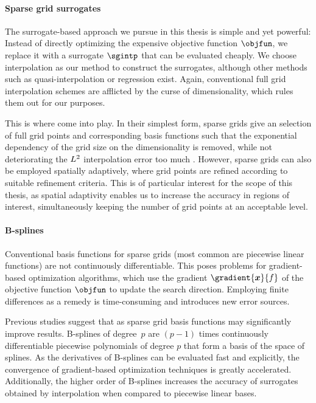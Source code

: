 \paragraph{Sparse grid surrogates}

The surrogate-based approach we pursue in this thesis is simple and
yet powerful:
Instead of directly optimizing the expensive objective function $\objfun$,
we replace it with a surrogate $\sgintp$ that can be evaluated cheaply.
We choose interpolation as our method to construct the surrogates,
although other methods such as quasi-interpolation
\cite{Hoellig13Approximation} or regression \cite{Pflueger10Spatially} exist.
Again, conventional full grid interpolation schemes are afflicted by the
curse of dimensionality, which rules them out for our purposes.

This is where  come into play.
In their simplest form, sparse grids give an  selection of
full grid points and corresponding basis functions such that
the exponential dependency of the grid size on the dimensionality
is removed, while not deteriorating the $L^2$ interpolation error too much
\cite{Bungartz04Sparse}.
However, sparse grids can also be employed spatially adaptively,
where grid points are refined  according to suitable
refinement criteria.
This is of particular interest for the scope of this thesis,
as spatial adaptivity enables us to increase the
accuracy in regions of interest,
simultaneously keeping the number of grid points at an acceptable level.

\paragraph{B-splines}

Conventional basis functions for sparse grids
(most common are piecewise linear functions)
are not continuously differentiable.
This poses problems for gradient-based optimization algorithms,
which use the gradient $\gradient{\*x}{f}$ of the
objective function $\objfun$ to update the search direction.
Employing finite differences as a remedy
is time-consuming and introduces new error sources.

Previous studies
suggest that 
as sparse grid basis functions may significantly improve results.
B-splines of degree~$p$ are $(p-1)$ times continuously differentiable
piecewise polynomials of degree $p$ that form a basis of the space of splines.
As the derivatives of B-splines can be evaluated fast and explicitly,
the convergence of gradient-based optimization techniques is
greatly accelerated.
Additionally, the higher order of B-splines increases the accuracy
of surrogates obtained by interpolation
when compared to piecewise linear bases.

